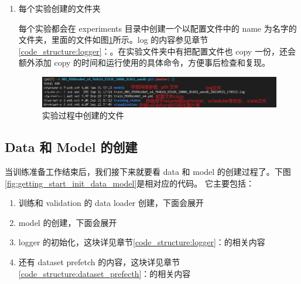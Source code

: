 \documentclass[../main.tex]{subfiles}
\begin{document}
\begin{enumerate}
    \item 每个实验创建的文件夹

          每个实验都会在 experiments 目录中创建一个以配置文件中的 name 为名字的文件夹，里面的文件如图\ref{fig:getting_start_exp_folder}所示。log 的内容参见章节\ref{code_structure:logger}：。在实验文件夹中有把配置文件也 copy 一份，还会额外添加 copy 的时间和运行使用的具体命令，方便事后检查和复现。

          \begin{figure}[h]
              \begin{center}
                  \vspace{-0.2cm}
                  \includegraphics[width=0.9\linewidth]{figures/getting_start_exp_folder.png}
                  \vspace{-0.3cm}
                  \caption{实验过程中创建的文件}
                  \label{fig:getting_start_exp_folder}
              \end{center}
              \vspace{-0.5cm}
          \end{figure}
\end{enumerate}

\subsection{Data 和 Model 的创建}\label{getting_start:data_model_creation}

当训练准备工作结束后，我们接下来就要看 data 和 model 的创建过程了。下图\ref{fig:getting_start_init_data_model}是相对应的代码。
它主要包括：
\begin{enumerate}
    \item 训练和 validation 的 data loader 创建，下面会展开
    \item model 的创建，下面会展开
    \item logger 的初始化，这块详见章节\ref{code_structure:logger}：的相关内容
    \item 还有 dataset prefetch 的内容，这块详见章节\ref{code_structure:dataset_prefecth}：的相关内容
\end{enumerate}
\end{document}
